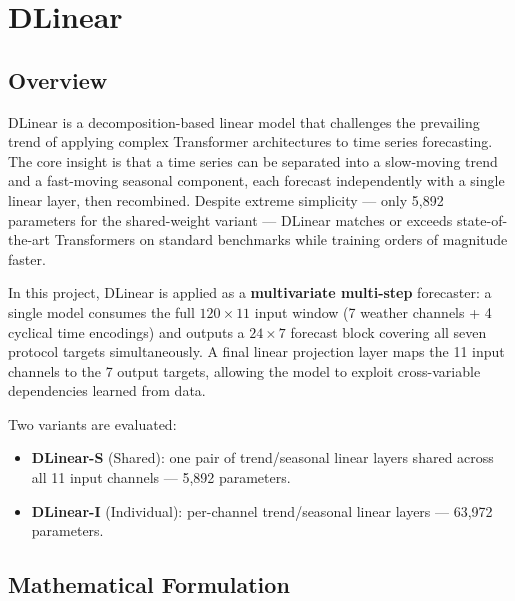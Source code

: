 

\section{DLinear}
\label{sec:dlinear}

\subsection{Overview}

DLinear \citep{zeng2023dlinear} is a decomposition-based linear model that
challenges the prevailing trend of applying complex Transformer architectures
to time series forecasting. The core insight is that a time series can be
separated into a slow-moving trend and a fast-moving seasonal component, each
forecast independently with a single linear layer, then recombined. Despite
extreme simplicity --- only 5,892 parameters for the shared-weight variant ---
DLinear matches or exceeds state-of-the-art Transformers on standard benchmarks
while training orders of magnitude faster.

In this project, DLinear is applied as a \textbf{multivariate multi-step}
forecaster: a single model consumes the full $120 \times 11$ input window
(7 weather channels + 4 cyclical time encodings) and outputs a $24 \times 7$
forecast block covering all seven protocol targets simultaneously. A final linear
projection layer maps the 11 input channels to the 7 output targets, allowing the
model to exploit cross-variable dependencies learned from data.

Two variants are evaluated:
\begin{itemize}
  \item \textbf{DLinear-S} (Shared): one pair of trend/seasonal linear layers
        shared across all 11 input channels --- 5,892 parameters.
  \item \textbf{DLinear-I} (Individual): per-channel trend/seasonal linear
        layers --- 63,972 parameters.
\end{itemize}

\subsection{Mathematical Formulation}

